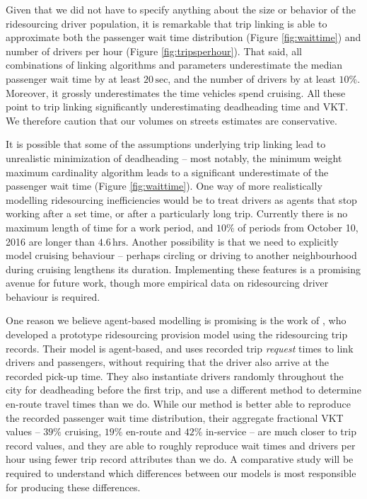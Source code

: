 \documentclass[]{trbunofficial_bdit_final}
\begin{document}
Given that we did not have to specify anything about the size or behavior of
the ridesourcing driver population, it is remarkable that trip linking is able
to approximate both the passenger wait time distribution (Figure
\ref{fig:waittime}) and number of drivers per hour (Figure \ref{fig:tripsperhour}).
That said, all combinations of linking algorithms and parameters underestimate
the median passenger wait time by at least \(20\,\mathrm{sec}\), and the number
of drivers by at least \(10\%\). Moreover, it grossly underestimates the time
vehicles spend cruising. All these point to trip linking significantly
underestimating deadheading time and VKT. We therefore caution that our volumes
on streets estimates are conservative.

It is possible that some of the assumptions underlying trip linking lead to
unrealistic minimization of deadheading -- most notably, the minimum
weight maximum cardinality algorithm leads to a significant underestimate of
the passenger wait time (Figure \ref{fig:waittime}). One way of more realistically
modelling ridesourcing inefficiencies would be to treat drivers as
agents that stop working after a set time, or after a particularly long trip.
Currently there is no maximum length of time for a work period, and \(10\%\) of
periods from October 10, 2016 are longer than \(4.6\,\mathrm{hrs}\). Another
possibility is that we need to explicitly model cruising behaviour -- perhaps
circling or driving to another neighbourhood during cruising lengthens its
duration. Implementing these features is a promising avenue for future work,
though more empirical data on ridesourcing driver behaviour is required.

One reason we believe agent-based modelling is promising is the work of
, who developed a prototype ridesourcing provision model
using the ridesourcing trip records. Their model is agent-based, and uses
recorded trip \emph{request} times to link drivers and passengers, without requiring
that the driver also arrive at the recorded pick-up time. They also instantiate
drivers randomly throughout the city for deadheading before the first trip, and
use a different method to determine en-route travel times than we do. While our
method is better able to reproduce the recorded passenger wait time distribution,
their aggregate fractional VKT values -- \(39\%\) cruising, \(19\%\) en-route and \(42\%\)
in-service -- are much closer to trip record values, and they are able to
roughly reproduce wait times and drivers per hour using fewer trip record
attributes than we do. A comparative study will be required to understand which
differences between our models is most responsible for producing these
differences.
\end{document}
